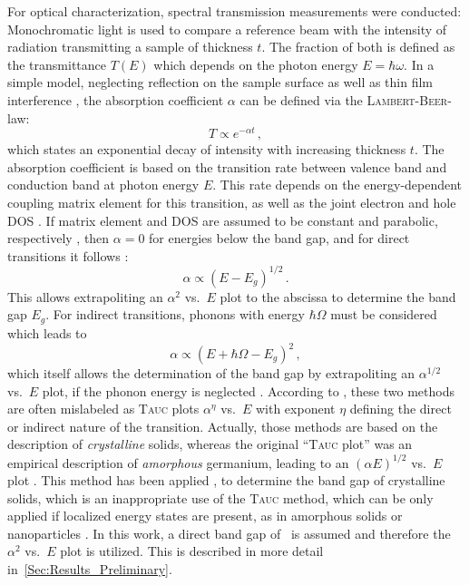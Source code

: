 For optical characterization, spectral transmission measurements were conducted:
Mo\-no\-chro\-ma\-tic light is used to compare a reference beam with the intensity of radiation transmitting a sample of thickness $t$.
The fraction of both is defined as the transmittance $T(E)$ which depends on the photon energy $E=\hbar\omega$.
In a simple model, neglecting reflection on the sample surface as well as thin film interference
    \cite{manifacier1977},
the absorption coefficient $\alpha$ can be defined via the \textsc{Lambert}-\textsc{Beer}-law:
\begin{equation}
    T\propto e^{-\alpha t}\,,
\end{equation}
which states an exponential decay of intensity with increasing thickness $t$.
The absorption coefficient is based on the transition rate between valence band and conduction band at photon energy $E$.
This rate depends on the energy-dependent coupling matrix element for this transition, as well as the joint electron and hole \gls{DOS}
    \cite{zanatta2019}.
If matrix element and \gls{DOS} are assumed to be constant and parabolic, respectively
    \cite{tauc2005},
then $\alpha=0$ for energies below the band gap, and for direct transitions it follows \cite{zanatta2019}:
\begin{equation}
    \alpha\propto (E-E_g)^{1/2}\,.
\end{equation}
This allows extrapoliting an $\alpha^2$ vs.\ $E$ plot to the abscissa to determine the band gap $E_g$.
For indirect transitions, phonons with energy $\hbar\Omega$ must be considered which leads to
\begin{equation}
    \alpha\propto (E+\hbar\Omega-E_g)^2\,,
\end{equation}
which itself allows the determination of the band gap by extrapoliting an $\alpha^{1/2}$ vs.\ $E$ plot, if the phonon energy is neglected
    \cite{zanatta2019}.
According to \textcite{zanatta2019}, these two methods are often mislabeled as \textsc{Tauc} plots $\alpha^\eta$ vs.\ $E$ with exponent $\eta$ defining the direct or indirect nature of the transition.
Actually, those methods are based on the description of \emph{crystalline} solids, whereas the original \enquote{\textsc{Tauc} plot} was an empirical description of \emph{amorphous} germanium, leading to an $(\alpha E)^{1/2}$ vs.\ $E$ plot
    \cite{tauc2005}.
This method has been applied
    \cite{cheng1996,al-kuhaili2007,singh2019,farrell2015},
to determine the band gap of crystalline solids, which is an inappropriate use of the \textsc{Tauc} method, which can be only applied if localized energy states are present, as in amorphous solids or nanoparticles
    \cite{dolgonos2016}.
In this work, a direct band gap of \cro\ is assumed and therefore the $\alpha^2$ vs.\ $E$ plot is utilized.
This is described in more detail in~\ref{Sec:Results_Preliminary}.

